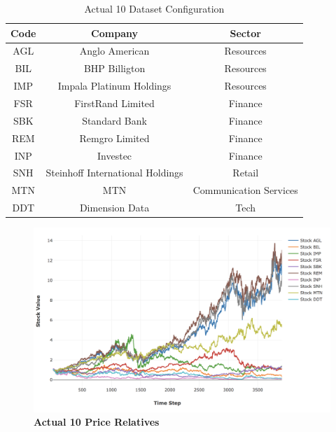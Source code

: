 \documentclass[a4paper,11pt,oneside]{article}
\theoremstyle{plain}
\theoremstyle{definition}
\begin{document}
	\begin{table}[H]
		\centering
		\begin{tabular}{|c|c|c|}
			\hline
			\textbf{Code} &\textbf{Company} & \textbf{Sector} \\\hline	
			{AGL} & {Anglo American} & {Resources}  \\\hline
			{BIL} & {BHP Billigton} & {Resources}  \\\hline
			{IMP} & {Impala Platinum Holdings} & {Resources}  \\\hline
			{FSR} & {FirstRand Limited} & {Finance}  \\\hline
			{SBK} & {Standard Bank} & {Finance}  \\\hline
			{REM} & {Remgro Limited} & {Finance}  \\\hline
			{INP} & {Investec} & {Finance}  \\\hline
			{SNH} & {Steinhoff International Holdings} & {Retail}    \\\hline
			{MTN} & {MTN} & {Communication Services}  \\\hline
			{DDT} & {Dimension Data} & {Tech} \\\hline
		\end{tabular}
		\newline\newline
		\caption{Actual 10 Dataset Configuration}\label{tab_actual10}
	\end{table}
	
	\begin{figure}[H]
		\centering
		\includegraphics[scale=0.45]{images/results/prices/actual10_prices.png} 
		\caption[Actual 10 Prices]{\textbf{Actual 10 Price Relatives}}
		\label{figure-actual10_prices}
	\end{figure}
	
\end{document}
